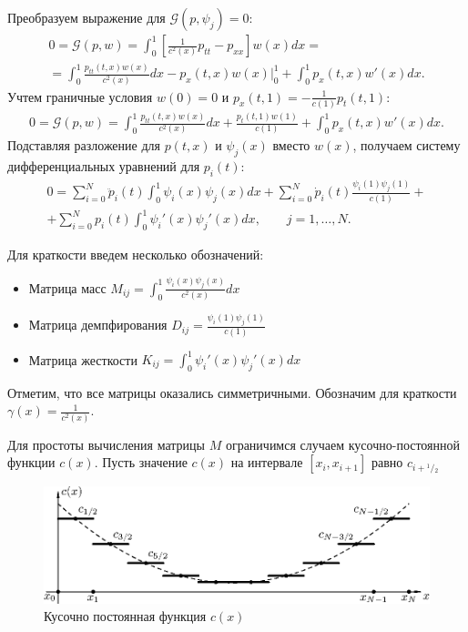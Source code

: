 \documentclass[12pt]{article}
\newcommand{\cutefrac}[2]{{}^{#1\!}\!/{\!}_#2}
\newcommand{\half}{\cutefrac{1}{2}}
\begin{document}
Преобразуем выражение для $\mathcal{G}(p, \psi_j) = 0$:
\begin{gather*}
0 = \mathcal{G}(p, w) 
= \int_0^1 \left[\frac{1}{c^2(x)} p_{tt} - p_{xx}\right] w(x) dx = \\
= 
\int_0^1 \frac{p_{tt}(t, x) w(x)}{c^2(x)} dx
-p_{x}(t, x) w(x)\Big|_0^1
+\int_0^1 p_{x}(t, x) w'(x) dx.
\end{gather*}
Учтем граничные условия $w(0) = 0$ и $p_x(t, 1) =
-\displaystyle\frac{1}{c(1)}p_t(t, 1)$:
\begin{gather*}
0 = \mathcal{G}(p, w)
= 
\int_0^1 \frac{p_{tt}(t, x) w(x)}{c^2(x)} dx
+\frac{p_{t}(t, 1) w(1)}{c(1)}
+\int_0^1 p_{x}(t, x) w'(x) dx.
\end{gather*}
Подставляя разложение для $p(t, x)$ и $\psi_j(x)$ вместо $w(x)$, получаем систему
дифференциальных уравнений для $p_i(t)$:
\begin{multline}
0 = \sum_{i=0}^N \ddot p_i(t) \int_0^1 \psi_i(x) \psi_j(x) dx 
+ \sum_{i=0}^N \dot p_i(t) \frac{\psi_i(1) \psi_j(1)}{c(1)} + {}\\
+ \sum_{i=0}^N p_i(t) \int_0^1 \psi_i'(x) \psi_j'(x) dx, \qquad j = 1, \dots,
N.\qquad
\label{eq:ode}
\end{multline}

Для краткости введем несколько обозначений:
\begin{itemize}
\item Матрица масс $M_{ij} = \displaystyle\int_0^1 \frac{\psi_i(x)\psi_j(x)}{c^2(x)} dx$
\item Матрица демпфирования $D_{ij} =
\displaystyle\frac{\psi_i(1)\psi_j(1)}{c(1)}$
\item Матрица жесткости $K_{ij} = \displaystyle\int_0^1 \psi_i'(x)\psi_j'(x) dx$
\end{itemize}
Отметим, что все матрицы оказались симметричными. Обозначим для краткости
$\gamma(x) = \frac{1}{c^2(x)}$. 

Для простоты вычисления матрицы $M$ ограничимся случаем кусочно-постоянной
функции $c(x)$. Пусть значение $c(x)$ на интервале $[x_i, x_{i+1}]$ равно 
$c_{i+\half}$

\begin{figure}[!ht]
\centering
\includegraphics[width=.8\textwidth]{func-2.eps}
\caption{Кусочно постоянная функция $c(x)$}
\end{figure}
\end{document}

